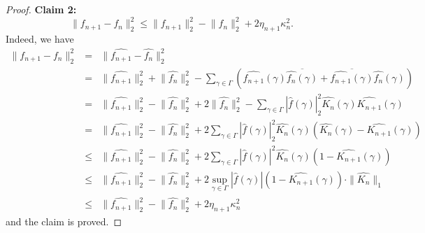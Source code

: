 \documentclass[10pt]{article}
\theoremstyle{definition}
\begin{document}
\begin{proof}
\noindent	\textbf{Claim 2:} 
    \[
        \lVert f_{n+1} - f_n \rVert_2^2 \leq \lVert f_{n+1} \rVert_2^2 - \lVert f_n \rVert_2^2 + 2 \eta_{n+1} \kappa_n^2.
    \]
	Indeed, we have
	\begin{eqnarray*}
	\lVert f_{n+1} - f_n \rVert_2^2 
&= &	\lVert \widehat{f_{n+1}} - \widehat{f_n} \rVert_2^2 \\
&= &	\lVert \widehat{f_{n+1}} \rVert_2^2 + \lVert \widehat{f_n} \rVert_2^2 - \sum_{\gamma \in \Gamma} 
\left(\widehat{f_{n+1}}(\gamma) \overline{\widehat{f_{n}}(\gamma)} + \overline{\widehat{f_{n+1}}(\gamma)} \widehat{f_{n}}(\gamma) \right)\\
&= &	\lVert \widehat{f_{n+1}} \rVert_2^2 - \lVert \widehat{f_n} \rVert_2^2 + 2 \lVert \widehat{f_n} \rVert_2^2 - \sum_{\gamma \in \Gamma}	\left| \widehat{f}(\gamma) \right|_2^2 \widehat{K_n}(\gamma) \widehat{K_{n+1}}(\gamma)\\
&= & \lVert \widehat{f_{n+1}} \rVert_2^2 - \lVert \widehat{f_n} \rVert_2^2 + 2 \sum_{\gamma \in \Gamma}	\left| \widehat{f}(\gamma) \right|_2^2 \widehat{K_n}(\gamma) 
\left( \widehat{K_n}(\gamma) - \widehat{K_{n+1}}(\gamma) \right)\\
& \leq & \lVert \widehat{f_{n+1}} \rVert_2^2 - \lVert \widehat{f_n} \rVert_2^2 + 2 \sum_{\gamma \in \Gamma}	\left| \widehat{f}(\gamma) \right|^2 \widehat{K_n}(\gamma) 
\left(1 - \widehat{K_{n+1}}(\gamma) \right) \\
& \leq & \lVert \widehat{f_{n+1}} \rVert_2^2 - \lVert \widehat{f_n} \rVert_2^2 + 2 \sup_{\gamma \in \Gamma} |\widehat{f}(\gamma)| \left( 1 - \widehat{K_{n+1}}(\gamma) \right) \cdot \| \widehat{K_n} \|_1 \\
& \leq & \lVert \widehat{f_{n+1}} \rVert_2^2 - \lVert \widehat{f_n} \rVert_2^2 + 2 \eta_{n+1} \kappa_n^2
	\end{eqnarray*}
 and the claim is proved.
   

\end{proof}
\end{document}
